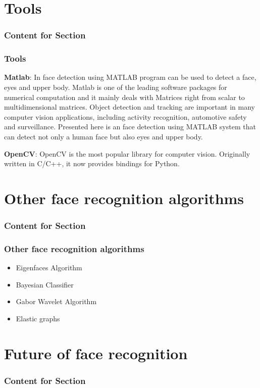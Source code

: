 \documentclass[xcolor=dvipsnames]{beamer}
\begin{document}
    \section{Tools}
    \begin{frame}
      \frametitle{Content for Section \thesection}
      \tableofcontents[currentsection]
    \end{frame}
    
    \begin{frame}
        \frametitle{Tools}
    \textbf{Matlab}: In face detection using MATLAB program can be used to detect a face, eyes and upper body. Matlab is one of the leading software packages for numerical computation and it mainly deals with Matrices right from scalar to multidimensional matrices. Object detection and tracking are important in many computer vision applications, including activity recognition, automotive safety and surveillance. Presented here is an face detection using MATLAB system that can detect not only a human face but also eyes and upper body. \newline

\textbf{OpenCV}: OpenCV is the most popular library for computer vision. Originally written in C/C++, it now provides bindings for Python.
    \end{frame}
    
    \section{Other face recognition algorithms}
    \begin{frame}
      \frametitle{Content for Section \thesection}
      \tableofcontents[currentsection]
    \end{frame}
    
    \begin{frame}
    \frametitle{Other face recognition algorithms}
    \begin{itemize}
    \item Eigenfaces Algorithm
    \item Bayesian Classifier
    \item Gabor Wavelet Algorithm
    \item Elastic graphs  
    \end{itemize}
    \end{frame}
    
    \section{Future of face recognition}
    \begin{frame}
      \frametitle{Content for Section \thesection}
      \tableofcontents[currentsection]
    \end{frame}
    
\end{document}
